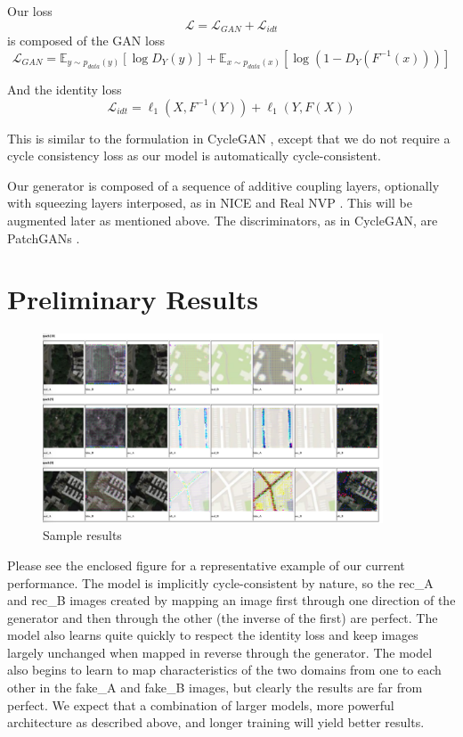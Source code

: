\documentclass{article}
\begin{document}
Our loss $$\mathcal{L} = \mathcal{L}_{GAN} + \mathcal{L}_{idt}$$ is composed of the GAN loss $$\mathcal{L}_{GAN} = \mathbb{E}_{y\sim p_{data}(y)}[\log D_Y(y)] + \mathbb{E}_{x\sim p_{data}(x)}[\log (1 - D_Y(F^{-1}(x)))]$$

And the identity loss 
$$\mathcal{L}_{idt} = \ell_1(X, F^{-1}(Y)) + \ell_1(Y, F(X))$$

This is similar to the formulation in CycleGAN \citep{zhu2017unpaired}, except that we do not require a cycle consistency loss as our model is automatically cycle-consistent.

Our generator is composed of a sequence of additive coupling layers, optionally with squeezing layers interposed, as in NICE \citep{dinh2014nice} and Real NVP \citep{dinh2016density}. This will be augmented later as mentioned above.
The discriminators, as in CycleGAN, are PatchGANs \citep{isola2017image}.

\section{Preliminary Results}

\begin{figure}[h]
\centering
\includegraphics[width=0.9\textwidth]{results.png}
\caption{Sample results}
\end{figure} 

Please see the enclosed figure for a representative example of our current performance. The model is implicitly cycle-consistent by nature, so the rec\_A and rec\_B images created by mapping an image first through one direction of the generator and then through the other (the inverse of the first) are perfect. The model also learns quite quickly to respect the identity loss and keep images largely unchanged when mapped in reverse through the generator. The model also begins to learn to map characteristics of the two domains from one to each other in the fake\_A and fake\_B images, but clearly the results are far from perfect. We expect that a combination of larger models, more powerful architecture as described above, and longer training will yield better results.



\appendix
\end{document}
